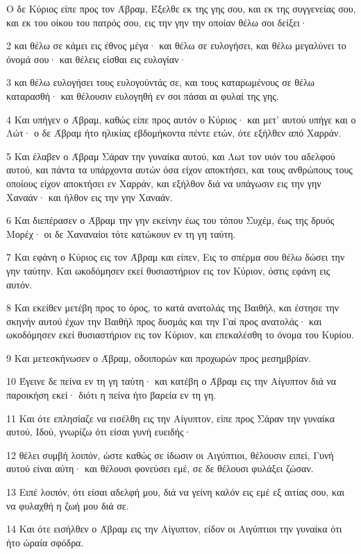 \par Ο δε Κύριος είπε προς τον Άβραμ, Έξελθε εκ της γης σου, και εκ της συγγενείας σου, και εκ του οίκου του πατρός σου, εις την γην την οποίαν θέλω σοι δείξει·
\par 2 και θέλω σε κάμει εις έθνος μέγα· και θέλω σε ευλογήσει, και θέλω μεγαλύνει το όνομά σου· και θέλεις είσθαι εις ευλογίαν·
\par 3 και θέλω ευλογήσει τους ευλογούντάς σε, και τους καταρωμένους σε θέλω καταρασθή· και θέλουσιν ευλογηθή εν σοι πάσαι αι φυλαί της γης.
\par 4 Και υπήγεν ο Άβραμ, καθώς είπε προς αυτόν ο Κύριος· και μετ' αυτού υπήγε και ο Λώτ· ο δε Άβραμ ήτο ηλικίας εβδομήκοντα πέντε ετών, ότε εξήλθεν από Χαρράν.
\par 5 Και έλαβεν ο Άβραμ Σάραν την γυναίκα αυτού, και Λωτ τον υιόν του αδελφού αυτού, και πάντα τα υπάρχοντα αυτών όσα είχον αποκτήσει, και τους ανθρώπους τους οποίους είχον αποκτήσει εν Χαρράν, και εξήλθον διά να υπάγωσιν εις την γην Χαναάν· και ήλθον εις την γην Χαναάν.
\par 6 Και διεπέρασεν ο Άβραμ την γην εκείνην έως του τόπου Συχέμ, έως της δρυός Μορέχ· οι δε Χαναναίοι τότε κατώκουν εν τη γη ταύτη.
\par 7 Και εφάνη ο Κύριος εις τον Άβραμ και είπεν, Εις το σπέρμα σου θέλω δώσει την γην ταύτην. Και ωκοδόμησεν εκεί θυσιαστήριον εις τον Κύριον, όστις εφάνη εις αυτόν.
\par 8 Και εκείθεν μετέβη προς το όρος, το κατά ανατολάς της Βαιθήλ, και έστησε την σκηνήν αυτού έχων την Βαιθήλ προς δυσμάς και την Γαί προς ανατολάς· και ωκοδόμησεν εκεί θυσιαστήριον εις τον Κύριον, και επεκαλέσθη το όνομα του Κυρίου.
\par 9 Και μετεσκήνωσεν ο Άβραμ, οδοιπορών και προχωρών προς μεσημβρίαν.
\par 10 Έγεινε δε πείνα εν τη γη ταύτη· και κατέβη ο Άβραμ εις την Αίγυπτον διά να παροικήση εκεί· διότι η πείνα ήτο βαρεία εν τη γη.
\par 11 Και ότε επλησίαζε να εισέλθη εις την Αίγυπτον, είπε προς Σάραν την γυναίκα αυτού, Ιδού, γνωρίζω ότι είσαι γυνή ευειδής·
\par 12 θέλει συμβή λοιπόν, ώστε καθώς σε ίδωσιν οι Αιγύπτιοι, θέλουσιν ειπεί, Γυνή αυτού είναι αύτη· και θέλουσι φονεύσει εμέ, σε δε θέλουσι φυλάξει ζώσαν.
\par 13 Ειπέ λοιπόν, ότι είσαι αδελφή μου, διά να γείνη καλόν εις εμέ εξ αιτίας σου, και να φυλαχθή η ζωή μου διά σε.
\par 14 Και ότε εισήλθεν ο Άβραμ εις την Αίγυπτον, είδον οι Αιγύπτιοι την γυναίκα ότι ήτο ώραία σφόδρα.
